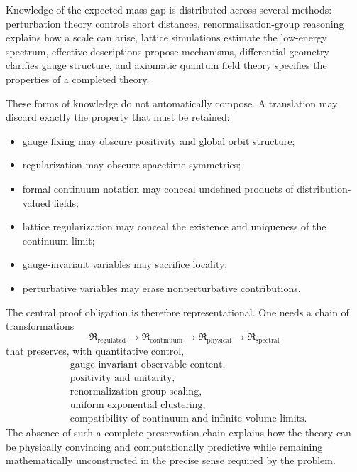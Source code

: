 \documentclass[11pt]{article}
\begin{document}
Knowledge of the expected mass gap is distributed across several methods:
perturbation theory controls short distances, renormalization-group reasoning
explains how a scale can arise, lattice simulations estimate the low-energy
spectrum, effective descriptions propose mechanisms, differential geometry
clarifies gauge structure, and axiomatic quantum field theory specifies the
properties of a completed theory.

These forms of knowledge do not automatically compose.  A translation may
discard exactly the property that must be retained:
\begin{itemize}[leftmargin=2em]
  \item gauge fixing may obscure positivity and global orbit structure;
  \item regularization may obscure spacetime symmetries;
  \item formal continuum notation may conceal undefined products of
        distribution-valued fields;
  \item lattice regularization may conceal the existence and uniqueness of the
        continuum limit;
  \item gauge-invariant variables may sacrifice locality;
  \item perturbative variables may erase nonperturbative contributions.
\end{itemize}

The central proof obligation is therefore representational.  One needs a chain
of transformations
\begin{equation}
  \mathfrak{R}_{\mathrm{regulated}}
  \longrightarrow
  \mathfrak{R}_{\mathrm{continuum}}
  \longrightarrow
  \mathfrak{R}_{\mathrm{physical}}
  \longrightarrow
  \mathfrak{R}_{\mathrm{spectral}}
  \label{eq:representation-chain}
\end{equation}
that preserves, with quantitative control,
\begin{equation}
\begin{aligned}
  &\text{gauge-invariant observable content},\\
  &\text{positivity and unitarity},\\
  &\text{renormalization-group scaling},\\
  &\text{uniform exponential clustering},\\
  &\text{compatibility of continuum and infinite-volume limits}.
\end{aligned}
\label{eq:preservation-obligations}
\end{equation}
The absence of such a complete preservation chain explains how the theory can
be physically convincing and computationally predictive while remaining
mathematically unconstructed in the precise sense required by the problem.
\end{document}
